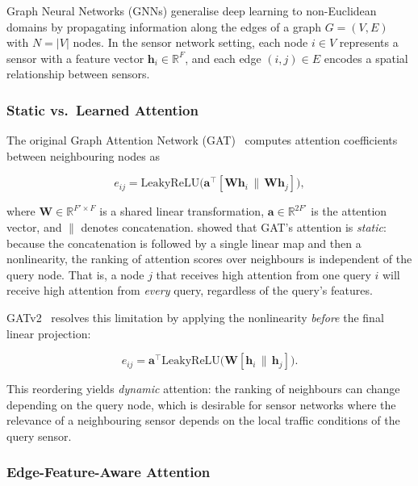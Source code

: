 Graph Neural Networks (GNNs) generalise deep learning to non-Euclidean domains by propagating information along the edges of a graph $G = (V, E)$ with $N = |V|$ nodes. In the sensor network setting, each node $i \in V$ represents a sensor with a feature vector $\mathbf{h}_i \in \mathbb{R}^{F}$, and each edge $(i,j) \in E$ encodes a spatial relationship between sensors.

\subsubsection{Static vs.\ Learned Attention}

The original Graph Attention Network (GAT)~\cite{velickovicGraphAttentionNetworks2018} computes attention coefficients between neighbouring nodes as

\begin{equation}
    e_{ij} = \text{LeakyReLU}\!\bigl(\mathbf{a}^{\top} [\mathbf{W}\mathbf{h}_i \,\|\, \mathbf{W}\mathbf{h}_j]\bigr),
    \label{eq:gat-static}
\end{equation}

\noindent where $\mathbf{W} \in \mathbb{R}^{F' \times F}$ is a shared linear transformation, $\mathbf{a} \in \mathbb{R}^{2F'}$ is the attention vector, and $\|$ denotes concatenation. \citet{brodyHowAttentiveAre2022} showed that GAT's attention is \emph{static}: because the concatenation is followed by a single linear map and then a nonlinearity, the ranking of attention scores over neighbours is independent of the query node. That is, a node $j$ that receives high attention from one query $i$ will receive high attention from \emph{every} query, regardless of the query's features.

GATv2~\cite{brodyHowAttentiveAre2022} resolves this limitation by applying the nonlinearity \emph{before} the final linear projection:

\begin{equation}
    e_{ij} = \mathbf{a}^{\top} \text{LeakyReLU}\!\bigl(\mathbf{W} [\mathbf{h}_i \,\|\, \mathbf{h}_j]\bigr).
    \label{eq:gatv2-dynamic}
\end{equation}

\noindent This reordering yields \emph{dynamic} attention: the ranking of neighbours can change depending on the query node, which is desirable for sensor networks where the relevance of a neighbouring sensor depends on the local traffic conditions of the query sensor.

\subsubsection{Edge-Feature-Aware Attention}

